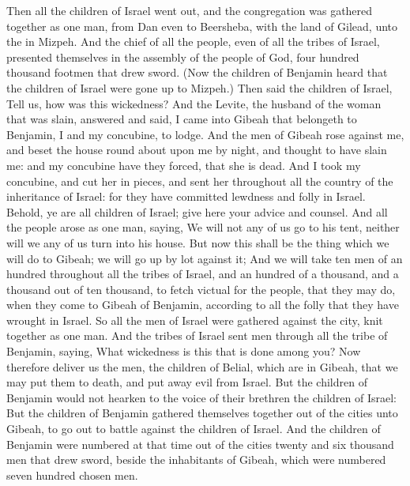 \begin{biblechapter} %
 Then all the children of Israel went out, and the congregation was gathered together as one man, from Dan even to Beersheba, with the land of Gilead, unto the \LORD in Mizpeh.
\verse And the chief of all the people, even of all the tribes of Israel, presented themselves in the assembly of the people of God, four hundred thousand footmen that drew sword.
\verse (Now the children of Benjamin heard that the children of Israel were gone up to Mizpeh.) Then said the children of Israel, Tell us, how was this wickedness?
\verse And the Levite, the husband of the woman that was slain, answered and said, I came into Gibeah that belongeth to Benjamin, I and my concubine, to lodge.
\verse And the men of Gibeah rose against me, and beset the house round about upon me by night, and thought to have slain me: and my concubine have they forced, that she is dead.
\verse And I took my concubine, and cut her in pieces, and sent her throughout all the country of the inheritance of Israel: for they have committed lewdness and folly in Israel.
\verse Behold, ye are all children of Israel; give here your advice and counsel.
\verse And all the people arose as one man, saying, We will not any of us go to his tent, neither will we any of us turn into his house.
\verse But now this shall be the thing which we will do to Gibeah; we will go up by lot against it;
\verse And we will take ten men of an hundred throughout all the tribes of Israel, and an hundred of a thousand, and a thousand out of ten thousand, to fetch victual for the people, that they may do, when they come to Gibeah of Benjamin, according to all the folly that they have wrought in Israel.
\verse So all the men of Israel were gathered against the city, knit together as one man.
\verse And the tribes of Israel sent men through all the tribe of Benjamin, saying, What wickedness is this that is done among you?
\verse Now therefore deliver us the men, the children of Belial, which are in Gibeah, that we may put them to death, and put away evil from Israel. But the children of Benjamin would not hearken to the voice of their brethren the children of Israel:
\verse But the children of Benjamin gathered themselves together out of the cities unto Gibeah, to go out to battle against the children of Israel.
\verse And the children of Benjamin were numbered at that time out of the cities twenty and six thousand men that drew sword, beside the inhabitants of Gibeah, which were numbered seven hundred chosen men.

\end{biblechapter}
